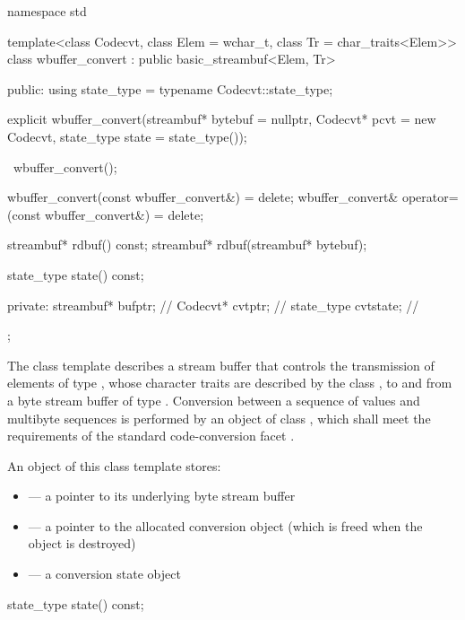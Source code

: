 %
\begin{codeblock}
namespace std {
  template<class Codecvt, class Elem = wchar_t, class Tr = char_traits<Elem>>
    class wbuffer_convert : public basic_streambuf<Elem, Tr> {
    public:
      using state_type = typename Codecvt::state_type;

      explicit wbuffer_convert(streambuf* bytebuf = nullptr,
                               Codecvt* pcvt = new Codecvt,
                               state_type state = state_type());

      ~wbuffer_convert();

      wbuffer_convert(const wbuffer_convert&) = delete;
      wbuffer_convert& operator=(const wbuffer_convert&) = delete;

      streambuf* rdbuf() const;
      streambuf* rdbuf(streambuf* bytebuf);

      state_type state() const;

    private:
      streambuf* bufptr;            // \expos
      Codecvt* cvtptr;              // \expos
      state_type cvtstate;          // \expos
  };
}
\end{codeblock}

\pnum
The class template describes a stream buffer that controls the
transmission of elements of type , whose character traits are
described by the class , to and from a byte stream buffer of type
. Conversion between a sequence of  values and
multibyte sequences is performed by an object of class
, which shall meet the requirements
of the standard code-conversion facet .

\pnum
An object of this class template stores:

\begin{itemize}
\item {} --- a pointer to its underlying byte stream buffer
\item {} --- a pointer to the allocated conversion object
(which is freed when the  object is destroyed)
\item {} --- a conversion state object
\end{itemize}

%
\begin{itemdecl}
state_type state() const;
\end{itemdecl}

